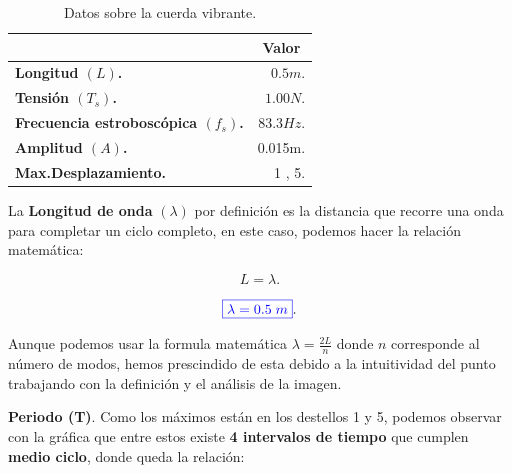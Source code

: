 \documentclass[a4paper,12pt]{article} %
\begin{document}
\begin{table}[h]
    \centering
    \renewcommand{\arraystretch}{1.5} %
    \begin{tabular}{|>{\bfseries}l|r|} %
    \hline
    \multicolumn{1}{|c|}{\textbf{Variable}} & \multicolumn{1}{c|}{\textbf{Valor}} \\
    \hline
    Longitud \((L)\). & \( 0.5m.\)  \\
    \hline
    Tensión \((T_s)\). &\( 1.00N.\) \\
    \hline
    Frecuencia estroboscópica \((f_s)\). &  \(83.3Hz\). \\
    \hline 
    Amplitud \((A)\). & 0.015m. \\
    \hline
    Max.Desplazamiento. & 1 , 5. \\
    \hline
    \end{tabular}
    \caption{Datos sobre la cuerda vibrante.}
\end{table}

\vspace{\baselineskip}



\begin{justify}
    La \textbf{Longitud de onda} \((\lambda)\) por definición es la distancia que recorre una onda para completar un ciclo completo,
    en este caso, podemos hacer la relación matemática:
\end{justify}

\[ L = \lambda.\]

\[\textcolor{blue}{\boxed{\lambda = 0.5 \; m}}.\]

\vspace{\baselineskip}

\begin{justify}
    Aunque podemos usar la formula matemática \(\boxed{ \lambda = \frac{2L}{n}}\) donde \(n\) corresponde al número de modos, hemos prescindido de esta debido 
    a la intuitividad del punto trabajando con la definición y el análisis de la imagen.
\end{justify}

\vspace{\baselineskip}

\begin{justify}
    \textbf{Periodo (T)}. Como los máximos están en los destellos 1 y 5, podemos observar con la gráfica que entre estos existe \textbf{4 intervalos de tiempo} que cumplen
    \textbf{medio ciclo}, donde queda la relación:
\end{justify}
\end{document}
